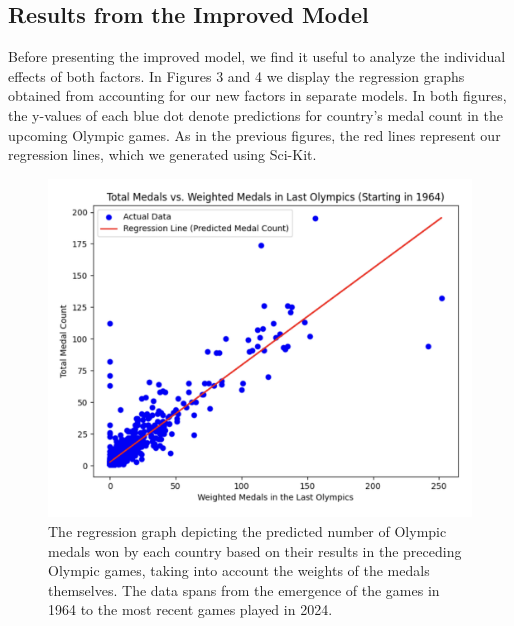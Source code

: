 \documentclass{mcmthesis}
\begin{document}
\subsection{Results from the Improved Model}
Before presenting the improved model, we find it useful to analyze the individual effects of both factors. In Figures 3 and 4 we display the regression graphs obtained from accounting for our new factors in separate models. In both figures, the y-values of each blue dot denote predictions for country's medal count in the upcoming Olympic games. As in the previous figures, the red lines represent our regression lines, which we generated using Sci-Kit. 
\begin{figure}
     \centering
     \includegraphics[width=\textwidth]{figures/Regression_Graph_Three.png}
     \caption{The regression graph depicting the predicted number of Olympic medals won by each country based on their results in the preceding Olympic games, taking into account the weights of the medals themselves. The data spans from the emergence of the games in 1964 to the most recent games played in 2024.}
     \label{fig:image 3}
\end{figure}
\end{document}
